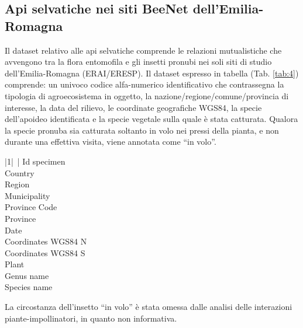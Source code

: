 \documentclass[main.tex]{subfiles}
\begin{document}
\subsection{Api selvatiche nei siti BeeNet dell’Emilia-Romagna}

Il dataset relativo alle api selvatiche comprende le relazioni mutualistiche che avvengono tra la flora entomofila e gli insetti pronubi nei soli siti di studio dell’Emilia-Romagna (ERAI/ERESP).
Il dataset espresso in tabella (Tab. \ref{tab:4}) comprende: un univoco codice alfa-numerico identificativo che contrassegna la tipologia di agroecosistema in oggetto, la nazione/regione/comune/provincia di interesse, la data del rilievo, le coordinate geografiche WGS84, la specie dell’apoideo identificata e la specie vegetale sulla quale è stata catturata. Qualora la specie pronuba sia catturata soltanto in volo nei pressi della pianta, e non durante una effettiva visita, viene annotata come “in volo”.

\begin{table}[h!]
    \centering
\begin{tabular}[]{|1|~|}
\hline
Id specimen\\
\hline
Country\\
\hline
Region\\
\hline
Municipality\\
\hline
Province Code\\
\hline
Province\\
\hline
Date\\
\hline
Coordinates WGS84 N\\
\hline
Coordinates WGS84 S\\
\hline
Plant\\
\hline
Genus name\\
\hline
Species name\\
\hline
\end{tabular}
    \caption{voci del dataset relativo alle api selvatiche.}
    \label{tab:4}
\end{table}

La circostanza dell’insetto “in volo” è stata omessa dalle analisi delle interazioni piante-impollinatori, in quanto non informativa.

\vspace{6cm}
\end{document}

